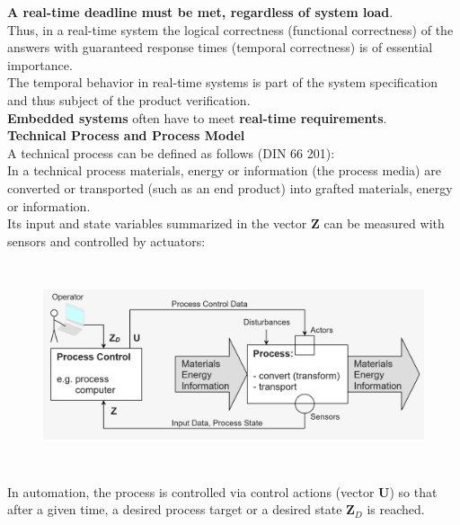 \textbf{A real-time deadline must be met, regardless of system load}.\\

Thus, in a real-time system the logical correctness (functional correctness) of the answers with guaranteed response times (temporal correctness) is of essential importance. \\

The temporal behavior in real-time systems is part of the system specification and thus subject of the product verification.\\

\textbf{Embedded systems} often have to meet \textbf{real-time requirements}.\\

{\rot\bf Technical Process and Process Model}\\

A technical process can be defined as follows (DIN 66 201):\\

In a technical process materials, energy or information (the process media) are converted or transported (such as an end product) into grafted materials, energy or information. \\

Its input and state variables summarized in the vector \textbf{Z} can be measured with sensors and controlled by actuators: \\

\begin{figure}[h]
    \centering
    \includegraphics[width=14cm, height=6cm]{Images/image60.png}
    \label{fig:Fig 3}
\end{figure}

In automation, the process is controlled via control actions (vector \textbf{U}) so that after a given time, a desired process target or a desired state \textbf{Z\textit{${}_{D}$}} is reached. \\

